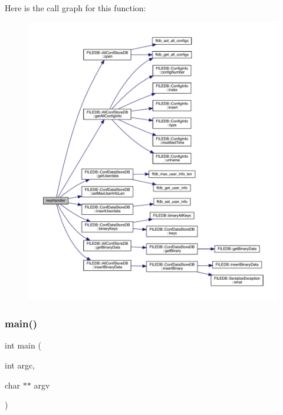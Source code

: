 Here is the call graph for this function\+:
\nopagebreak
\begin{figure}[H]
\begin{center}
\leavevmode
\includegraphics[width=350pt]{dd/da6/adat-devel_2main_2dbutil_2dbcombine_8cc_a4bb6e15c68dd2189289ab3095ab1ff5d_cgraph}
\end{center}
\end{figure}
\mbox{\label{adat-devel_2main_2dbutil_2dbcombine_8cc_a3c04138a5bfe5d72780bb7e82a18e627}} 
\subsubsection{\texorpdfstring{main()}{main()}}
{\footnotesize\ttfamily int main (\begin{DoxyParamCaption}\item[{int}]{argc,  }\item[{char $\ast$$\ast$}]{argv }\end{DoxyParamCaption})}

